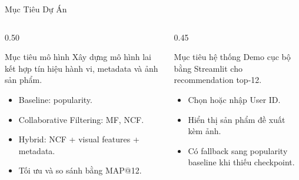 \documentclass[aspectratio=169,10pt]{beamer}
\begin{document}
\begin{frame}{Mục Tiêu Dự Án}
  \begin{columns}[T,totalwidth=\textwidth]
    \begin{column}{0.50\textwidth}
      \begin{block}{Mục tiêu mô hình}
        Xây dựng mô hình lai kết hợp tín hiệu hành vi, metadata và ảnh sản phẩm.
      \end{block}
      \begin{itemize}
        \item Baseline: popularity.
        \item Collaborative Filtering: MF, NCF.
        \item Hybrid: NCF + visual features + metadata.
        \item Tối ưu và so sánh bằng MAP@12.
      \end{itemize}
    \end{column}
    \begin{column}{0.45\textwidth}
      \begin{block}{Mục tiêu hệ thống}
        Demo cục bộ bằng Streamlit cho recommendation top-12.
      \end{block}
      \begin{itemize}
        \item Chọn hoặc nhập User ID.
        \item Hiển thị sản phẩm đề xuất kèm ảnh.
        \item Có fallback sang popularity baseline khi thiếu checkpoint.
      \end{itemize}
    \end{column}
  \end{columns}
\end{frame}

\end{document}
